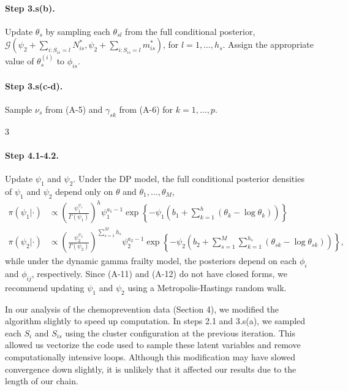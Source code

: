 \documentclass[10pt, letterpaper]{article}
\newcommand{\Gdist}{\mathcal{G}} %
\begin{document}
\paragraph{Step 3.s(b).} Update $\theta_s$ by sampling each $\theta_{sl}$ from the full conditional posterior, $\Gdist(\psi_2 + \sum_{i:S_{is}=l} N_{is}^*, \psi_2 + \sum_{i:S_{is}=l} m_{is}^*)$, for $l=1, \dots, h_s$. Assign the appropriate value of $\theta_s^{(i)}$ to $\phi_{is}$.

\paragraph{Step 3.s(c-d).} Sample $\nu_s$ from (A-5) and $\gamma_{sk}$ from (A-6) for $k=1, \dots, p$.

\vfill
\centerline{3}
\clearpage %

\paragraph{Step 4.1-4.2.} Update $\psi_1$ and $\psi_2$. Under the DP model, the full conditional posterior densities of $\psi_1$ and $\psi_2$ depend only on $\theta$ and $\theta_1, \dots, \theta_M$,
\begin{align} 
\pi(\psi_1 | \cdot) &\propto \left( \frac{\psi_1^{\psi_1}}{\Gamma(\psi_1)} \right)^h \psi_1^{a_1 - 1} \exp \left\{ - \psi_1 \left( b_1 + \sum_{k=1}^h (\theta_k - \log \theta_k) \right) \right\} \label{eq:A11} \tag{A-11} \\
\pi(\psi_2 | \cdot) &\propto \left( \frac{\psi_2^{\psi_2}}{\Gamma(\psi_2)} \right)^{\sum_{s=1}^M h_s} \psi_2^{a_2 - 1} \exp \left\{ - \psi_2 \left( b_2 + \sum_{s=1}^M \sum_{k=1}^{h_s} (\theta_{sk} - \log \theta_{sk}) \right) \right\}, \label{eq:A12} \tag{A-12} 
\end{align}
while under the dynamic gamma frailty model, the posteriors depend on each $\phi_i$ and $\phi_{ij}$, respectively. Since (A-11) and (A-12) do not have closed forms, we recommend updating $\psi_1$ and $\psi_2$ using a Metropolis-Hastings random walk.

In our analysis of the chemoprevention data (Section 4), we modified the algorithm slightly to speed up computation. In steps 2.1 and 3.s(a), we sampled each $S_i$ and $S_{is}$ using the cluster configuration at the previous iteration. This allowed us vectorize the code used to sample these latent variables and remove computationally intensive loops. Although this modification may have slowed convergence down slightly, it is unlikely that it affected our results due to the length of our chain.
\end{document}

